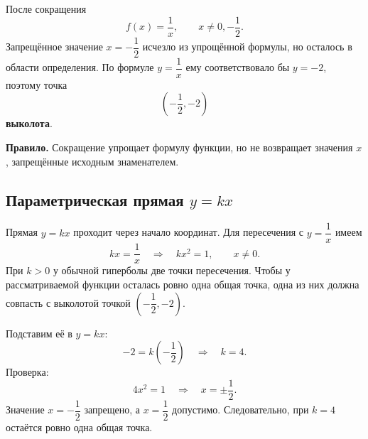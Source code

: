 \documentclass[a4paper,12pt]{article}
\newcommand{\term}[1]{\textcolor{darkaccent}{\textbf{#1}}}
\begin{document}
После сокращения
\[
f(x)=\frac1x,
\qquad
x\ne0,-\frac12.
\]
Запрещённое значение $x=-\dfrac12$ исчезло из упрощённой формулы,
но осталось в области определения. По формуле $y=\dfrac1x$ ему соответствовало бы
$y=-2$, поэтому точка
\[
\left(-\frac12,-2\right)
\]
\term{выколота}.

\textbf{Правило.}
Сокращение упрощает формулу функции, но не возвращает значения $x$,
запрещённые исходным знаменателем.

\subsection*{Параметрическая прямая $y=kx$}

Прямая $y=kx$ проходит через начало координат. Для пересечения с
$y=\dfrac1x$ имеем
\[
kx=\frac1x
\quad\Longrightarrow\quad
kx^2=1,
\qquad x\ne0.
\]
При $k>0$ у обычной гиперболы две точки пересечения.
Чтобы у рассматриваемой функции осталась ровно одна общая точка,
одна из них должна совпасть с выколотой точкой
$\left(-\dfrac12,-2\right)$.

Подставим её в $y=kx$:
\[
-2=k\left(-\frac12\right)
\quad\Longrightarrow\quad
\boxed{k=4}.
\]
Проверка:
\[
4x^2=1
\quad\Longrightarrow\quad
x=\pm\frac12.
\]
Значение $x=-\dfrac12$ запрещено, а $x=\dfrac12$ допустимо.
Следовательно, при $k=4$ остаётся ровно одна общая точка.


\clearpage
{}
\thispagestyle{empty}
\end{document}
